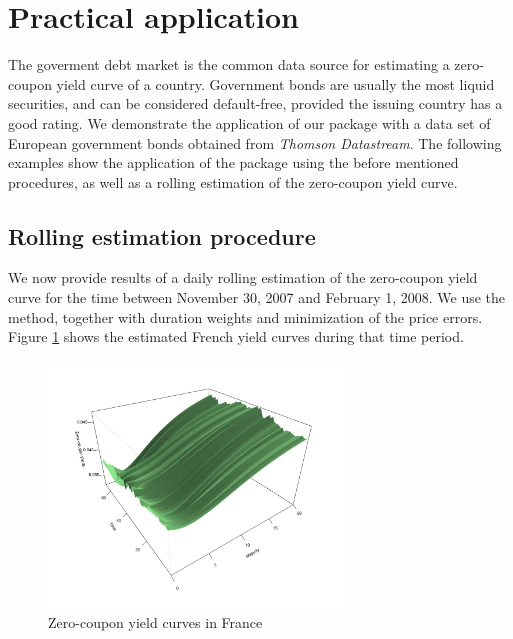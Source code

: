\section{Practical application}
\label{sec:pract-appl}

The goverment debt market is the common data source for estimating a zero-coupon yield curve of a country. Government bonds are usually the most liquid securities, and can be considered default-free, provided the issuing country has a good rating. We demonstrate the application of our package with a data set of European government bonds obtained from \emph{Thomson Datastream}\texttrademark. The following examples show the application of the package using the before mentioned procedures, as well as a rolling estimation of the zero-coupon yield curve.




\subsection{Rolling estimation procedure}

We now provide results of a daily rolling estimation of the zero-coupon yield curve for the time between November 30, 2007 and February 1, 2008. We use the \cite{Svensson1994} method, together with duration weights and minimization of the price errors. Figure \ref{fig:3dplot} shows the estimated French yield curves during that time period.

\begin{figure}[htb]
  \begin{center}
\includegraphics[width=0.7\textwidth]{3dplot}
  \caption{Zero-coupon yield curves in France}
  \label{fig:3dplot}
\end{center}
\end{figure}

